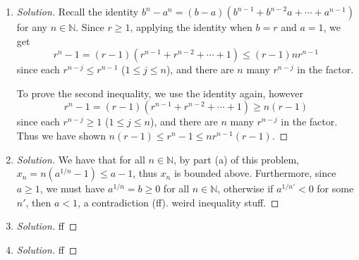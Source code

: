 \documentclass{article}
\newcommand{\N}{{\mathbb N}}
\begin{document}
\begin{enumerate}
	\item \begin{proof}[Solution]\let\qed\relax
		Recall the identity $b^n - a^n =
		(b-a)(b^{n-1} + b^{n-2}a + \cdots + a^{n-1})$
		for any $n \in \N$.
		Since $r \geq 1$,
		applying the identity when $b = r$ and $a = 1$,
		we get
		\[
			r^n - 1 = (r-1)(r^{n-1} + r^{n-2} + \cdots + 1) \leq (r-1)nr^{n-1}
		\]
		since each $r^{n-j} \leq r^{n-1}$ ($1 \leq j \leq n$),
		and there are $n$ many $r^{n-j}$ in the factor. 

		To prove the second inequality,
		we use the identity again,
		however
		\[
			r^n - 1 = (r-1)(r^{n-1} + r^{n-2} + \cdots + 1) \geq n(r-1)
		\]
		since each $r^{n-j} \geq 1$ ($1 \leq j \leq n$),
		and there are $n$ many $r^{n-j}$ in the factor.
		Thus we have shown $n(r-1) \leq r^n - 1 \leq nr^{n-1}(r-1)$.
	\end{proof}
	\item \begin{proof}[Solution]\let\qed\relax
		We have that for all $n \in \N$,
		by part (a) of this problem,
		$x_n = n\left(a^{1/n}-1\right) \leq a - 1$,
		thus $x_n$ is bounded above.
		Furthermore,
		since $a \geq 1$, we must have $a^{1/n} = b \geq 0$ for all $n \in \N$,
		otherwise if $a^{1/n'} < 0$ for some $n'$,
		then $a < 1$, a contradiction
		(ff).
		weird inequality stuff.
	\end{proof}
	\item \begin{proof}[Solution]\let\qed\relax
		ff
	\end{proof}
	\item \begin{proof}[Solution]\let\qed\relax
		ff
	\end{proof}
\end{enumerate}
\clearpage
\end{document}
